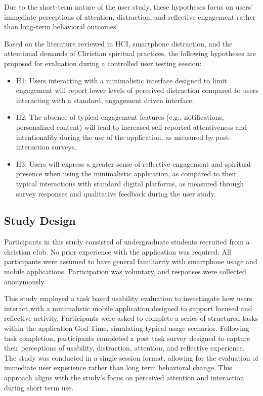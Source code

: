 \documentclass[12pt]{article}
\begin{document}
Due to the short-term nature of the user study, these hypotheses focus on users' immediate perceptions of attention, distraction, and reflective engagement rather than long-term behavioral outcomes. 

Based on the literature reviewed in HCI, smartphone distraction, and the attentional demands of Christian spiritual practices, the following hypotheses are proposed for evaluation during a controlled user testing session: 

\begin{itemize}
\item H1: Users interacting with a minimalistic interface designed to limit engagement will report lower levels of perceived distraction compared to users interacting with a standard, engagement driven interface. 
\item H2: The absence of typical engagement features (e.g., notifications, personalized content) will lead to increased self-reported attentiveness and intentionality during the use of the application, as measured by post-interaction surveys.
\item H3: Users will express a greater sense of reflective engagement and spiritual presence when using the minimalistic application, as compared to their typical interactions with standard digital platforms, as measured through survey responses and qualitative feedback during the user study.
\end{itemize}

\subsection{Study Design}
Participants in this study consisted of undergraduate students recruited from a christian club. No prior experience with the application was required. All participants were assumed to have general familiarity with smartphone usage and mobile applications. Participation was voluntary, and responses were collected anonymously. 

This study employed a task based usability evaluation to investiagate how users interact with a minimalistic mobile application designed to support focused and reflective activity. Participants were asked to complete a series of structured tasks within the application God Time, simulating typical usage scenarios. Following task completion, participants completed a post task survey designed to capture their perceptions of usability, distraction, attention, and reflective experience. The study was conducted in a single session format, allowing for the evaluation of immediate user experience rather than long term behavioral change. This approach aligns with the study's focus on perceived attention and interaction during short term use.
\end{document}

